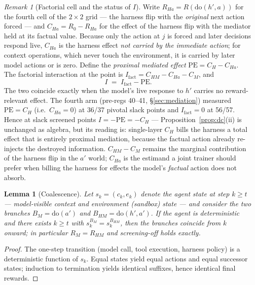 \documentclass{article}
\newtheorem{lemma}{Lemma}
\theoremstyle{remark}
\newtheorem{remark}{Remark}
\begin{document}
\begin{remark}[Factorial cell and the status of $I$]
\label{rem:factorial}
Write $R_{Ha} = R(\mathrm{do}(h', a))$ for the fourth cell of the
$2\times 2$ grid --- the harness flip with the \emph{original} next
action forced --- and $C_{Ha} = R_0 - R_{Ha}$ for the effect of the
harness flip with the mediator held at its factual value. Because only
the action at $j$ is forced and later decisions respond live, $C_{Ha}$
is the harness effect \emph{not carried by the immediate action}; for
context operations, which never touch the environment, it is carried by
later model actions or is zero. Define the \emph{proximal mediated
effect} $\mathrm{PE} = C_H - C_{Ha}$. The factorial interaction at the
point is $I_{\text{fact}} = C_{HM} - C_{Ha} - C_M$, and
\[
  I \;=\; I_{\text{fact}} - \mathrm{PE}.
\]
The two coincide exactly when the model's live response to $h'$ carries
no reward-relevant effect. The fourth arm (pre-regs 40--41,
\S\ref{sec:mediation}) measured $\mathrm{PE} = C_H$ (i.e.\ $C_{Ha} =
0$) at 36/37 pivotal slack points and $I_{\text{fact}} = 0$ at 56/57.
Hence at slack screened points $I = -\mathrm{PE} = -C_H$ ---
Proposition~\ref{prop:dc}(ii) is unchanged as algebra, but its reading
is: single-layer $C_H$ bills the harness a total effect that is entirely
proximal mediation, because the factual action already re-injects the
destroyed information. $C_{HM} - C_M$ remains the marginal contribution
of the harness flip in the $a'$ world; $C_{Ha}$ is the estimand a joint
trainer should prefer when billing the harness for effects the model's
\emph{factual} action does not absorb.
\end{remark}

\begin{lemma}[Coalescence]
\label{lem:coalesce}
Let $s_k = (c_k, e_k)$ denote the agent state at step $k \geq t$ ---
model-visible context and environment (sandbox) state --- and consider the
two branches $B_M = \mathrm{do}(a')$ and $B_{HM} = \mathrm{do}(h', a')$.
If the agent is deterministic and there exists $k \geq t$ with
$s_k^{B_M} = s_k^{B_{HM}}$, then the branches coincide from $k$ onward; in
particular $R_M = R_{HM}$ and screening-off holds \emph{exactly}.
\end{lemma}
\begin{proof}
The one-step transition (model call, tool execution, harness policy) is a
deterministic function of $s_k$. Equal states yield equal actions and equal
successor states; induction to termination yields identical suffixes, hence
identical final rewards.
\end{proof}
\end{document}
